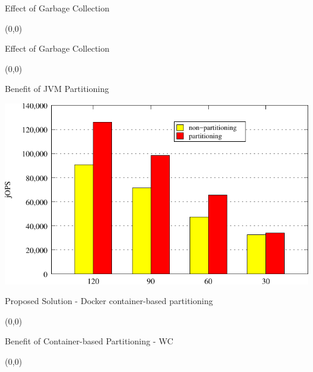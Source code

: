 \documentclass[english]{beamer} %
\begin{document}
\begin{frame}{Effect of Garbage Collection }
\begin{textblock}{1}(0,0)
\end{textblock} 
\end{frame}

\begin{frame}{Effect of Garbage Collection}
\begin{textblock}{1}(0,0)
\end{textblock} 
\end{frame}

\begin{frame}{Benefit of JVM Partitioning}
\begin{center}
\includegraphics[scale=0.9]{graph/SPECjbb2013}
\end{center}
\end{frame}

\begin{frame}{Proposed Solution - Docker container-based partitioning}
\begin{textblock}{1}(0,0)
\end{textblock} 
\end{frame}

\begin{frame}{Benefit of Container-based Partitioning - WC}
\begin{textblock}{1}(0,0)
\end{textblock} 
\end{frame}
\end{document}
